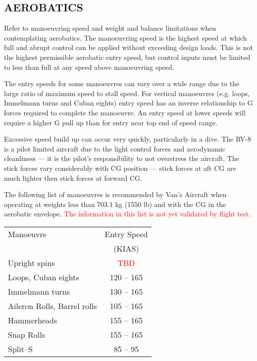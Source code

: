\subsection{AEROBATICS}

Refer to manoeuvring speed and weight and balance limitations when
contemplating aerobatics. The manoeuvring speed is the highest speed at
which full and abrupt control can be applied without exceeding design
loads. This is not the highest permissible aerobatic entry speed, but
control inputs must be limited to less than full at any speed above
manoeuvring speed.

The entry speeds for some manoeuvres can vary over a wide range due
to the large ratio of maximum speed to stall speed. For vertical manoeuvres
(e.g. loops, Immelmann turns and Cuban eights) entry speed has
an inverse relationship to G forces required to complete the manoeuvre.
An entry speed at lower speeds will require a higher G pull up than
for entry near top end of speed range. 

\begin{Note}[WARNING]
Excessive speed build up can occur very quickly, particularly in a
dive. The RV-8 is a pilot limited aircraft due to the light control
forces and aerodynamic cleanliness --- it is the pilot's responsibility
 to not overstress the aircraft. The stick forces vary considerably
with CG position --- stick forces at aft CG are much lighter then stick
forces at forward CG.
\end{Note}

\begin{Note}
The following list of manoeuvres is recommended by Van's Aircraft
when operating at weights less than 703.1 kg (1550 lb) and with the
CG in the aerobatic envelope. \textcolor{red}{The information in this list is not yet
validated by flight test.}
\end{Note}

\begin{center}\begin{tabular}{lc}
Manoeuvre&
Entry Speed\tabularnewline
&
(KIAS)\tabularnewline
Upright spins&
\textcolor{red}{TBD}\tabularnewline
Loops, Cuban eights&
120 -- 165\tabularnewline
Immelmann turns&
130 -- 165\tabularnewline
Aileron Rolls, Barrel rolls&
105 -- 165\tabularnewline
Hammerheads&
155 -- 165\tabularnewline
Snap Rolls&
155 -- 165\tabularnewline
Split--S&
85 -- 95\tabularnewline
\end{tabular}\end{center}


